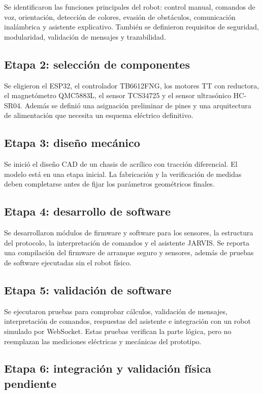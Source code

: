 \documentclass[journal]{IEEEtran}
\begin{document}
Se identificaron las funciones principales del robot: control manual, comandos de voz, orientación, detección de colores, evasión de obstáculos, comunicación inalámbrica y asistente explicativo. También se definieron requisitos de seguridad, modularidad, validación de mensajes y trazabilidad.

\subsection{Etapa 2: selección de componentes}

Se eligieron el ESP32, el controlador TB6612FNG, los motores TT con reductora, el magnetómetro QMC5883L, el sensor TCS34725 y el sensor ultrasónico HC-SR04. Además se definió una asignación preliminar de pines y una arquitectura de alimentación que necesita un esquema eléctrico definitivo.

\subsection{Etapa 3: diseño mecánico}

Se inició el diseño CAD de un chasis de acrílico con tracción diferencial. El modelo está en una etapa inicial. La fabricación y la verificación de medidas deben completarse antes de fijar los parámetros geométricos finales.

\subsection{Etapa 4: desarrollo de software}

Se desarrollaron módulos de firmware y software para los sensores, la estructura del protocolo, la interpretación de comandos y el asistente JARVIS. Se reporta una compilación del firmware de arranque seguro y sensores, además de pruebas de software ejecutadas sin el robot físico.

\subsection{Etapa 5: validación de software}

Se ejecutaron pruebas para comprobar cálculos, validación de mensajes, interpretación de comandos, respuestas del asistente e integración con un robot simulado por WebSocket. Estas pruebas verifican la parte lógica, pero no reemplazan las mediciones eléctricas y mecánicas del prototipo.

\subsection{Etapa 6: integración y validación física pendiente}
\end{document}
